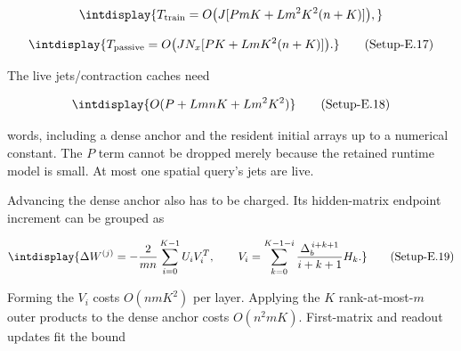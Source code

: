 \begingroup\renewcommand{\theHequation}{intdisplay.1020}
\begin{equation}
\intdisplay{
T_{\rm train}
=O\bigl(J[PmK+Lm^2K^2(n+K)]\bigr),
}
\label{int:eq-setup-e-training-work}
\end{equation}
\endgroup

\label{int:eq-setup-e-17}
\begingroup\renewcommand{\theHequation}{intdisplay.1021}
\begin{equation}
\intdisplay{
T_{\rm passive}
=O\bigl(JN_x[PK+LmK^2(n+K)]\bigr).
}
\tag{Setup-E.17}
\label{int:eq-0532-setup-e-17}
\end{equation}
\endgroup


The live jets/contraction caches need


\label{int:eq-setup-e-18}
\begingroup\renewcommand{\theHequation}{intdisplay.1022}
\begin{equation}
\intdisplay{
O(P+LmnK+Lm^2K^2)
}
\tag{Setup-E.18}
\label{int:eq-0533-setup-e-18}
\end{equation}
\endgroup


words, including a dense anchor and the resident initial arrays up to a numerical constant. The \(P\) term cannot be dropped merely because the retained runtime model is small. At most one spatial query's jets are live.



Advancing the dense anchor also has to be charged. Its hidden-matrix endpoint increment can be grouped as


\label{int:eq-setup-e-19}
\begingroup\renewcommand{\theHequation}{intdisplay.1023}
\begin{equation}
\intdisplay{
\Delta W^{(j)}=-\frac2{mn}\sum_{i=0}^{K-1}U_iV_i^T,
\qquad
V_i=\sum_{k=0}^{K-1-i}
              \frac{\Delta_b^{\,i+k+1}}{i+k+1}H_k.
}
\tag{Setup-E.19}
\label{int:eq-0534-setup-e-19}
\end{equation}
\endgroup


Forming the \(V_i\) costs \(O(nmK^2)\) per layer. Applying the \(K\) rank-at-most-\(m\) outer products to the dense anchor costs \(O(n^2mK)\). First-matrix and readout updates fit the bound


